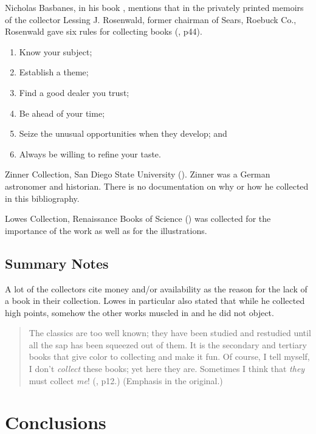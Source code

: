 \documentclass[letterpaper]{article}
\begin{document}
Nicholas Basbanes, in his book , mentions that in
the privately printed memoirs of the collector Lessing J. Rosenwald,
former chairman of Sears, Roebuck Co., Rosenwald gave six rules for
collecting books (\cite{Basbanes1999}, p44).

\begin{enumerate}
\item Know your subject;
\item Establish a theme;
\item Find a good dealer you trust;
\item Be ahead of your time;
\item Seize the unusual opportunities when they develop; and
\item Always be willing to refine your taste.
\end{enumerate}



Zinner Collection, San Diego State University
(\cite{Kenny1988}). Zinner was a German astronomer and historian.
There is no documentation on why or how he collected in this
bibliography.

Lowes Collection, Renaissance Books of Science (\cite{Godine1970})
was collected for the importance of the work as well as for the
illustrations.

\subsection{Summary Notes}

A lot of the collectors cite money and/or availability as the reason
for the lack of a book in their collection.  Lowes in particular also
stated that while he collected high points, somehow the other works
muscled in and he did not object.

\begin{quotation}
The classics are too well known; they have been studied and restudied
until all the sap has been squeezed out of them. It is the secondary
and tertiary books that give color to collecting and make it fun.  Of
course, I tell myself, I don't {\itshape collect} these books; yet
here they are. Sometimes I think that {\itshape they} must collect
{\itshape me}\thinspace! (\cite{Godine1970}, p12.) (Emphasis in the
original.)
\end{quotation}

\section{Conclusions}
\end{document}

